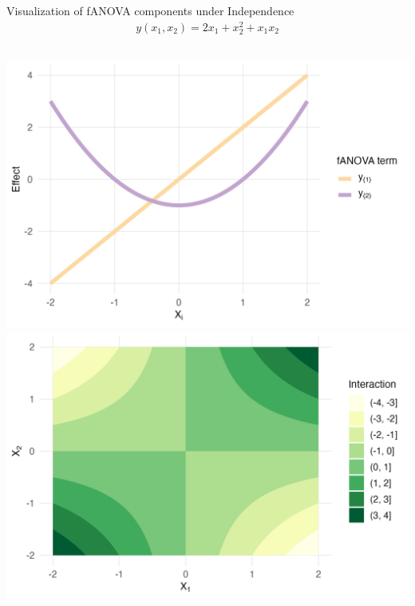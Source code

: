 \begin{frame}{Visualization of fANOVA components under Independence}
  \begin{align*}
    y(x_1, x_2) = 2x_1 + x_2^{2} + x_1 x_2
  \end{align*}
  \begin{columns}
      \centering
      \includegraphics[width=\linewidth]{../images/experiment_section/classical_ex_1_a1p20_a2p00_a11p00_a22p10_a12p10_rhop00_main.png}
      \centering
      \includegraphics[width=\linewidth]{../images/experiment_section/classical_ex_1_a1p20_a2p00_a11p00_a22p10_a12p10_rhop00_interaction.png}
  \end{columns}
\end{frame}





